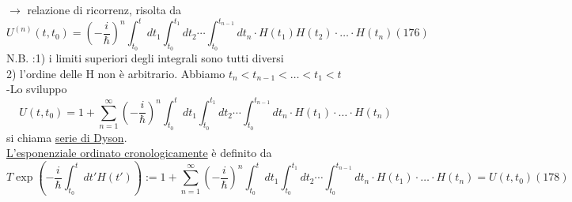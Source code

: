 \documentclass[a4paper,11pt]{report}
\begin{document}

$\rightarrow$ relazione di ricorrenz, risolta da
\begin{equation}
U^{(n)}(t,t_0)=\left(-\dfrac{i}{\hbar}\right)^n\int_{t_0}^tdt_1 \int_{t_0}^{t_1}dt_2 \cdots \int_{t_0}^{t_{n-1}}dt_n \cdot H(t_1)H(t_2)\cdot \dots \cdot H(t_n) (176)
\end{equation}
N.B. :1) i limiti superiori degli integrali sono tutti diversi\\
2) l'ordine delle H non è arbitrario. Abbiamo $t_n<t_{n-1}<\dots <t_1<t$\\
-Lo sviluppo 
$$
U(t,t_0)=1+\sum_{n=1}^\infty \left(-\dfrac{i}{\hbar}\right)^n \int_{t_0}^tdt_1 \int_{t_0}^{t_1}dt_2 \cdots \int_{t_0}^{t_{n-1}}dt_n \cdot H(t_1)\cdot \dots \cdot H(t_n)
$$
si chiama \underline{serie di Dyson}.\\
\underline{L'esponenziale ordinato cronologicamente} è definito da
\begin{equation}
T\exp\left(-\dfrac{i}{\hbar}\int_{t_0}^t dt' H(t')\right):=1+\sum_{n=1}^\infty \left(-\dfrac{i}{\hbar}\right)^n \int_{t_0}^tdt_1 \int_{t_0}^{t_1}dt_2 \cdots \int_{t_0}^{t_{n-1}}dt_n \cdot H(t_1)\cdot \dots \cdot H(t_n) = U(t,t_0) (178)
\end{equation}
\end{document}
